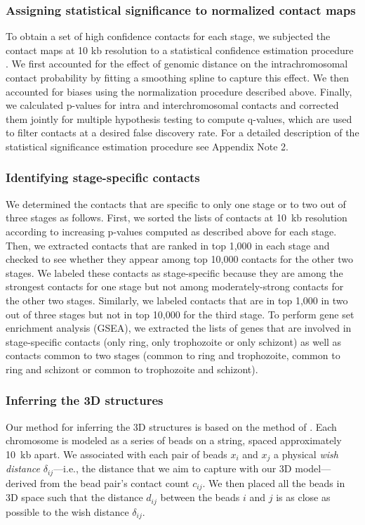 \subsubsection{Assigning statistical significance to normalized contact maps}
\label{met:fithic}
To obtain a set of high confidence contacts for each stage, we subjected the contact
maps at 10 kb resolution to a statistical confidence estimation procedure
\citep{ay:statistical}. We first accounted for the effect of genomic distance on the
intrachromosomal contact probability by fitting a smoothing spline to capture this
effect. We then accounted for biases using the normalization procedure described
above. Finally, we calculated p-values for intra and interchromosomal contacts and
corrected them jointly for multiple hypothesis testing to compute q-values, which
are used to filter contacts at a desired false discovery rate. For a detailed
description of the statistical significance estimation procedure see Appendix Note 2.

\subsubsection{Identifying stage-specific contacts}
\label{met:spageSpecific}
We determined the contacts that are specific to only one stage or to two out of three stages
as follows. First, we sorted the lists of contacts at 10~kb resolution according to increasing
p-values computed as described above for each stage. Then, we extracted contacts that are
ranked in top 1,000 in each stage and checked to see whether they appear among top 10,000
contacts for the other two stages. We labeled these contacts as stage-specific because they
are among the strongest contacts for one stage but not among moderately-strong contacts for
the other two stages. Similarly, we labeled contacts that are in top 1,000 in two out of
three stages but not in top 10,000 for the third stage. To perform gene set enrichment
analysis (GSEA), we extracted the lists of genes that are involved in stage-specific contacts
(only ring, only trophozoite or only schizont) as well as contacts common to two stages
(common to ring and trophozoite, common to ring and schizont or common to trophozoite and schizont).


\subsubsection{Inferring the 3D structures}
\label{met:inferring}
Our method for inferring the 3D structures is based on the method of \cite{duan:three}.
Each chromosome is modeled as a series of beads on a string, spaced approximately
10~kb apart. We associated with each pair of beads $x_i$ and $x_j$ a physical
{\em wish distance} $\delta_{ij}$---i.e., the distance that we aim to capture with
our 3D model---derived from the bead pair's contact count $c_{ij}$. We then
placed all the beads in 3D space such that the distance $d_{ij}$ between the beads
$i$ and $j$ is as close as possible to the wish distance $\delta_{ij}$.

